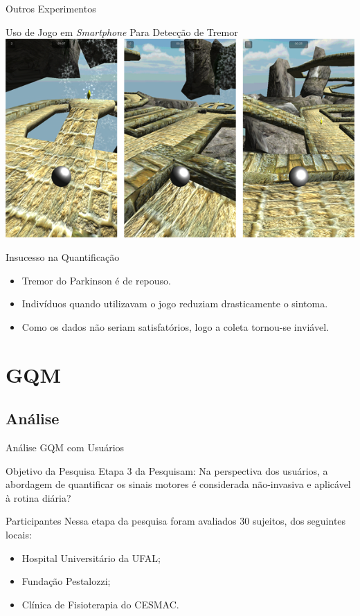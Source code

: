 \documentclass{beamer}
\begin{document}
\begin{frame}{Outros Experimentos}
	\begin{block}{Uso de Jogo em \textit{Smartphone} Para Detecção de Tremor}
	\center \includegraphics[height=1 in]{img/pinball_world.png}
	\end{block}
	\begin{block}{Insucesso na Quantificação}
			\begin{itemize}[<+->]
			\item Tremor do Parkinson é de repouso.
			\item Indivíduos quando utilizavam o jogo reduziam drasticamente o sintoma.
			\item Como os dados não seriam satisfatórios, logo a coleta tornou-se inviável.
		\end{itemize}
	\end{block}
\end{frame}






\section{GQM}
\subsection{Análise}
\begin{frame}{Análise GQM com Usuários} 
    \begin{block}{Objetivo da Pesquisa}
      Etapa 3 da Pesquisam: Na perspectiva dos usuários, a abordagem de quantificar os sinais motores é considerada não-invasiva e aplicável à rotina diária?
    \end{block}
		\begin{block}{Participantes}
		Nessa etapa da pesquisa foram avaliados 30 sujeitos, dos seguintes locais: 
			\begin{itemize}
				\item Hospital Universitário da UFAL;
				\item Fundação Pestalozzi;
				\item Clínica de Fisioterapia do CESMAC.
			\end{itemize}
    \end{block}
\end{frame} 
\end{document}
